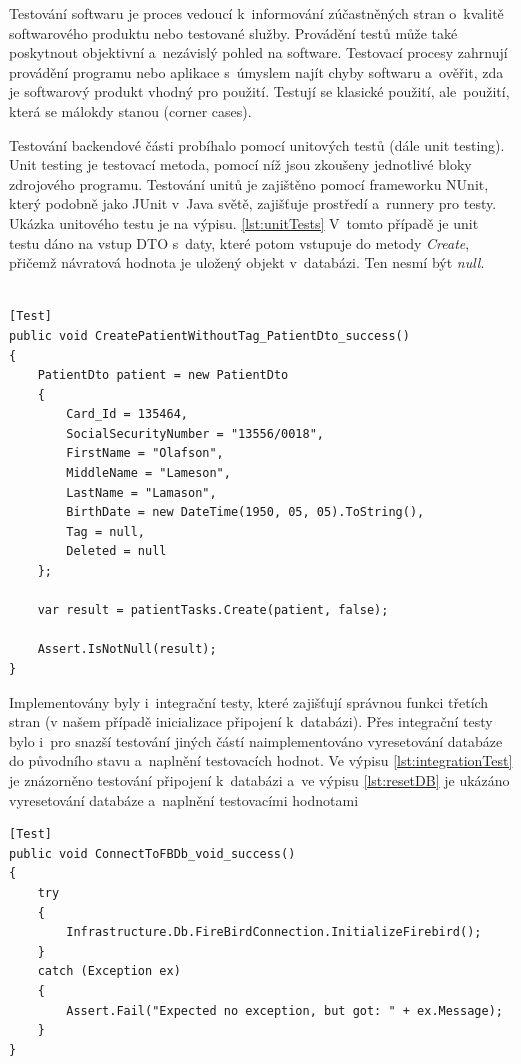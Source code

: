 
Testování softwaru je proces vedoucí k~informování zúčastněných stran o~kvalitě softwarového produktu nebo testované služby. Provádění testů může také poskytnout objektivní a~nezávislý pohled na software. Testovací procesy zahrnují provádění programu nebo aplikace s~úmyslem najít chyby softwaru a~ověřit, zda je softwarový produkt vhodný pro použití. Testují se klasické použití, ale~použití, která se málokdy stanou (corner cases). 

Testování backendové části probíhalo pomocí unitových testů (dále unit testing). Unit testing je testovací metoda, pomocí níž jsou zkoušeny jednotlivé bloky zdrojového programu. Testování unitů je zajištěno pomocí frameworku NUnit, který podobně jako JUnit v~Java světě, zajišťuje prostředí a~runnery pro testy. Ukázka unitového testu je na výpisu. \ref{lst:unitTests} V~tomto případě je unit testu dáno na vstup DTO s~daty, které potom vstupuje do metody \textit{Create}, přičemž návratová hodnota je uložený objekt v~databázi. Ten nesmí být \textit{null}.

\begin{lstlisting}[numbers=none, caption={Ukázka unit testů.}, label=lst:unitTests]

[Test]
public void CreatePatientWithoutTag_PatientDto_success()
{
	PatientDto patient = new PatientDto
	{
		Card_Id = 135464,
		SocialSecurityNumber = "13556/0018",
		FirstName = "Olafson",
		MiddleName = "Lameson",
		LastName = "Lamason",
		BirthDate = new DateTime(1950, 05, 05).ToString(),
		Tag = null,
		Deleted = null
	};

	var result = patientTasks.Create(patient, false);
	
	Assert.IsNotNull(result);
}
\end{lstlisting}

Implementovány byly i~integrační testy, které zajišťují správnou funkci třetích stran (v našem případě inicializace připojení k~databázi). Přes integrační testy bylo i~pro snazší testování jiných částí naimplementováno vyresetování databáze do původního stavu a~naplnění testovacích hodnot. Ve výpisu \ref{lst:integrationTest} je znázorněno testování připojení k~databázi a~ve výpisu \ref{lst:resetDB} je ukázáno vyresetování databáze a~naplnění testovacími hodnotami

\begin{lstlisting}[numbers=none, caption={Ukázka integračního testu.}, label=lst:integrationTest]
[Test]
public void ConnectToFBDb_void_success()
{
	try
	{
		Infrastructure.Db.FireBirdConnection.InitializeFirebird();
	}
	catch (Exception ex)
	{
		Assert.Fail("Expected no exception, but got: " + ex.Message);
	}
}
\end{lstlisting}

